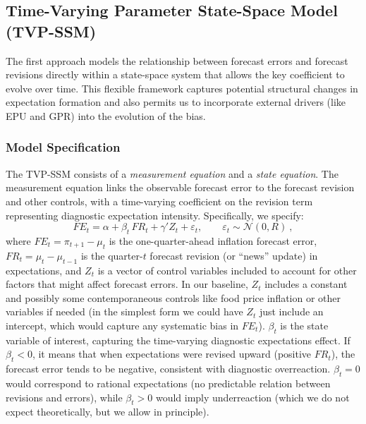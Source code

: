 \documentclass[12pt]{article}
\begin{document}
\subsection{Time-Varying Parameter State-Space Model (TVP-SSM)}
The first approach models the relationship between forecast errors and forecast revisions directly within a state-space system that allows the key coefficient to evolve over time. This flexible framework captures potential structural changes in expectation formation and also permits us to incorporate external drivers (like EPU and GPR) into the evolution of the bias.

\subsubsection{Model Specification}
The TVP-SSM consists of a \emph{measurement equation} and a \emph{state equation}. The measurement equation links the observable forecast error to the forecast revision and other controls, with a time-varying coefficient on the revision term representing diagnostic expectation intensity. Specifically, we specify:
\begin{equation}\label{eq:measurement}
    FE_t = \alpha + \beta_t\, FR_t + \gamma' Z_t + \varepsilon_t, \qquad \varepsilon_t \sim \mathcal{N}(0, R)~,
\end{equation}
where $FE_t = \pi_{t+1} - \mu_t$ is the one-quarter-ahead inflation forecast error, $FR_t = \mu_t - \mu_{t-1}$ is the quarter-$t$ forecast revision (or ``news'' update) in expectations, and $Z_t$ is a vector of control variables included to account for other factors that might affect forecast errors. In our baseline, $Z_t$ includes a constant and possibly some contemporaneous controls like food price inflation or other variables if needed (in the simplest form we could have $Z_t$ just include an intercept, which would capture any systematic bias in $FE_t$). $\beta_t$ is the state variable of interest, capturing the time-varying diagnostic expectations effect. If $\beta_t < 0$, it means that when expectations were revised upward (positive $FR_t$), the forecast error tends to be negative, consistent with diagnostic overreaction. $\beta_t = 0$ would correspond to rational expectations (no predictable relation between revisions and errors), while $\beta_t > 0$ would imply underreaction (which we do not expect theoretically, but we allow in principle).
\end{document}
